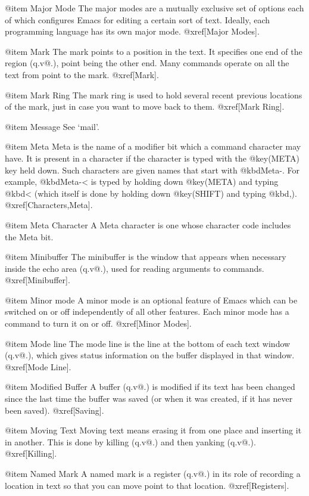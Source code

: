 @item Major Mode
The major modes are a mutually exclusive set of options each of which
configures Emacs for editing a certain sort of text.  Ideally, each
programming language has its own major mode.  @xref[Major Modes].

@item Mark
The mark points to a position in the text.  It specifies one end of the
region (q.v@.), point being the other end.  Many commands operate on
all the text from point to the mark.  @xref[Mark].

@item Mark Ring
The mark ring is used to hold several recent previous locations of
the mark, just in case you want to move back to them.  @xref[Mark Ring].

@item Message
See `mail'.

@item Meta
Meta is the name of a modifier bit which a command character may have.  It
is present in a character if the character is typed with the @key(META) key
held down.  Such characters are given names that start with @kbd{Meta-}.
For example, @kbd{Meta-<} is typed by holding down @key(META) and typing
@kbd{<} (which itself is done by holding down @key(SHIFT) and typing
@kbd{,}).  @xref[Characters,Meta].

@item Meta Character
A Meta character is one whose character code includes the Meta bit.

@item Minibuffer
The minibuffer is the window that appears when necessary inside the echo
area (q.v@.), used for reading arguments to commands.  @xref[Minibuffer].

@item Minor mode
A minor mode is an optional feature of Emacs which can be switched on or
off independently of all other features.  Each minor mode has a command to
turn it on or off.  @xref[Minor Modes].

@item Mode line
The mode line is the line at the bottom of each text window (q.v@.), which
gives status information on the buffer displayed in that window.
@xref[Mode Line].

@item Modified Buffer
A buffer (q.v@.) is modified if its text has been changed since the last
time the buffer was saved (or when it was created, if it has never been
saved).  @xref[Saving].

@item Moving Text
Moving text means erasing it from one place and inserting it in another.
This is done by killing (q.v@.) and then yanking (q.v@.).  @xref[Killing].

@item Named Mark
A named mark is a register (q.v@.) in its role of recording a location in
text so that you can move point to that location.  @xref[Registers].

